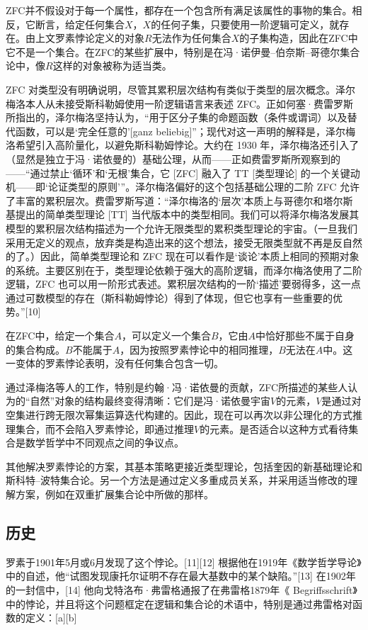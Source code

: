 ZFC并不假设对于每一个属性，都存在一个包含所有满足该属性的事物的集合。相反，它断言，给定任何集合\(X\)，\(X\)的任何子集，只要使用一阶逻辑可定义，就存在。由上文罗素悖论定义的对象\(R\)无法作为任何集合\(X\)的子集构造，因此在ZFC中它不是一个集合。在ZFC的某些扩展中，特别是在冯·诺伊曼–伯奈斯–哥德尔集合论中，像\(R\)这样的对象被称为适当类。

ZFC 对类型没有明确说明，尽管其累积层次结构有类似于类型的层次概念。泽尔梅洛本人从未接受斯科勒姆使用一阶逻辑语言来表述 ZFC。正如何塞·费雷罗斯所指出的，泽尔梅洛坚持认为，“用于区分子集的命题函数（条件或谓词）以及替代函数，可以是‘完全任意的’[ganz beliebig]”；现代对这一声明的解释是，泽尔梅洛希望引入高阶量化，以避免斯科勒姆悖论。大约在 1930 年，泽尔梅洛还引入了（显然是独立于冯·诺依曼的）基础公理，从而——正如费雷罗斯所观察到的——“通过禁止‘循环’和‘无根’集合，它 [ZFC] 融入了 TT [类型理论] 的一个关键动机——即‘论证类型的原则’”。泽尔梅洛偏好的这个包括基础公理的二阶 ZFC 允许了丰富的累积层次。费雷罗斯写道：“泽尔梅洛的‘层次’本质上与哥德尔和塔尔斯基提出的简单类型理论 [TT] 当代版本中的类型相同。我们可以将泽尔梅洛发展其模型的累积层次结构描述为一个允许无限类型的累积类型理论的宇宙。（一旦我们采用无定义的观点，放弃类是构造出来的这个想法，接受无限类型就不再是反自然的了。）因此，简单类型理论和 ZFC 现在可以看作是‘谈论’本质上相同的预期对象的系统。主要区别在于，类型理论依赖于强大的高阶逻辑，而泽尔梅洛使用了二阶逻辑，ZFC 也可以用一阶形式表述。累积层次结构的一阶‘描述’要弱得多，这一点通过可数模型的存在（斯科勒姆悖论）得到了体现，但它也享有一些重要的优势。”[10]

在ZFC中，给定一个集合\(A\)，可以定义一个集合\(B\)，它由\(A\)中恰好那些不属于自身的集合构成。\(B\)不能属于\(A\)，因为按照罗素悖论中的相同推理，\(B\)无法在\(A\)中。这一变体的罗素悖论表明，没有任何集合包含一切。

通过泽梅洛等人的工作，特别是约翰·冯·诺依曼的贡献，ZFC所描述的某些人认为的“自然”对象的结构最终变得清晰：它们是冯·诺依曼宇宙\(V\)的元素，\(V\)是通过对空集进行跨无限次幂集运算迭代构建的。因此，现在可以再次以非公理化的方式推理集合，而不会陷入罗素悖论，即通过推理\(V\)的元素。是否适合以这种方式看待集合是数学哲学中不同观点之间的争议点。

其他解决罗素悖论的方案，其基本策略更接近类型理论，包括奎因的新基础理论和斯科特–波特集合论。另一个方法是通过定义多重成员关系，并采用适当修改的理解方案，例如在双重扩展集合论中所做的那样。
\subsection{历史}  
罗素于1901年5月或6月发现了这个悖论。[11][12] 根据他在1919年《数学哲学导论》中的自述，他“试图发现康托尔证明不存在最大基数中的某个缺陷。”[13] 在1902年的一封信中，[14] 他向戈特洛布·弗雷格通报了在弗雷格1879年《 Begriffsschrift》中的悖论，并且将这个问题框定在逻辑和集合论的术语中，特别是通过弗雷格对函数的定义：[a][b]

